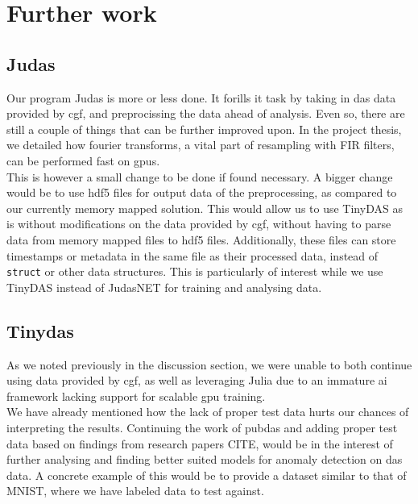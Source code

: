 \section{Further work}
\label{conc:further}

\subsection{Judas}

Our program Judas is more or less done. It forills it task by taking in \acrshort{das} data provided by \acrshort{cgf}, and preprocissing the data ahead of analysis. Even so, there are still a couple of things that can be further improved upon. In the project thesis, we detailed how fourier transforms, a vital part of resampling with FIR filters, can be performed fast on \acrshort{gpu}s. \\

This is however a small change to be done if found necessary. A bigger change would be to use \acrshort{hdf5} files for output data of the preprocessing, as compared to our currently memory mapped solution. This would allow us to use TinyDAS as is without modifications on the data provided by \acrshort{cgf}, without having to parse data from memory mapped files to \acrshort{hdf5} files. Additionally, these files can store timestamps or metadata in the same file as their processed data, instead of \texttt{struct} or other data structures. This is particularly of interest while we use TinyDAS instead of JudasNET for training and analysing data.

\subsection{Tinydas}

As we noted previously in the discussion section, we were unable to both continue using data provided by \acrshort{cgf}, as well as leveraging Julia due to an immature \acrshort{ai} framework lacking support for scalable \acrshort{gpu} training. \\

We have already mentioned how the lack of proper test data hurts our chances of interpreting the results. Continuing the work of \Gls{pubdas} and adding proper test data based on findings from research papers CITE, would be in the interest of further analysing and finding better suited models for anomaly detection on \acrshort{das} data. A concrete example of this would be to provide a dataset similar to that of MNIST, where we have labeled data to test against. \\

